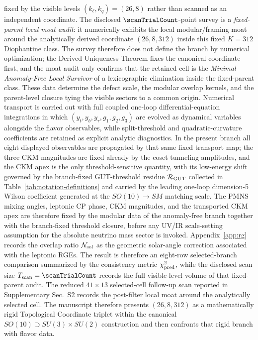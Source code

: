 \documentclass[11pt]{article}
\begin{document}
fixed by the visible levels $(k_{\ell},k_q)=(26,8)$ rather than scanned as an independent coordinate. The disclosed $\scanTrialCount$-point survey is a \emph{fixed-parent local moat audit}: it numerically exhibits the local modular/framing moat around the analytically derived coordinate $(26,8,312)$ inside this fixed $K=312$ Diophantine class. The survey therefore does not define the branch by numerical optimization; the Derived Uniqueness Theorem fixes the canonical coordinate first, and the moat audit only confirms that the retained cell is the \emph{Minimal Anomaly-Free Local Survivor} of a lexicographic elimination inside the fixed-parent class. These data determine the defect scale, the modular overlap kernels, and the parent-level closure tying the visible sectors to a common origin. Numerical transport is carried out with full coupled one-loop differential-equation integrations in which $(y_t,y_b,y_\tau,g_1,g_2,g_3)$ are evolved as dynamical variables alongside the flavor observables, while split-threshold and quadratic-curvature coefficients are retained as explicit analytic diagnostics. In the present branch all eight displayed observables are propagated by that same fixed transport map; the three CKM magnitudes are fixed already by the coset tunneling amplitudes, and the CKM apex is the only threshold-sensitive quantity, with its low-energy shift governed by the branch-fixed GUT-threshold residue $\mathcal R_{\rm GUT}$ collected in Table~\ref{tab:notation-definitions} and carried by the leading one-loop dimension-5 Wilson coefficient generated at the $SO(10)\to SM$ matching scale. The PMNS mixing angles, leptonic CP phase, CKM magnitudes, and the transported CKM apex are therefore fixed by the modular data of the anomaly-free branch together with the branch-fixed threshold closure, before any UV/IR scale-setting assumption for the absolute neutrino mass sector is invoked. Appendix~\ref{app:rg} records the overlap ratio $\mathcal N_{\rm sol}$ as the geometric solar-angle correction associated with the leptonic RGEs. The result is therefore an eight-row selected-branch comparison summarized by the consistency metric $\chi_{\rm pred}^2$, while the disclosed scan size $T_{\rm scan}=\scanTrialCount$ records the full visible-level volume of that fixed-parent audit. The reduced $41\times13$ selected-cell follow-up scan reported in Supplementary Sec.~S2 records the post-filter local moat around the analytically selected cell. The manuscript therefore presents $(26,8,312)$ as a mathematically rigid Topological Coordinate triplet within the canonical $SO(10)\supset SU(3)\times SU(2)$ construction and then confronts that rigid branch with flavor data.
\end{document}
